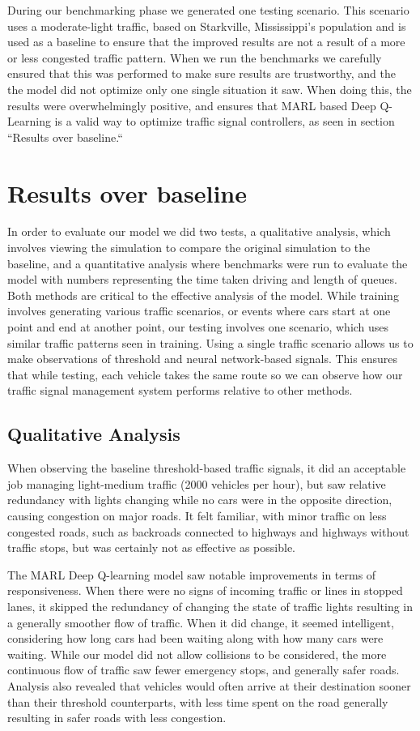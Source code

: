 \documentclass[conference]{IEEEtran}
\begin{document}
During our benchmarking phase we generated one testing scenario. This scenario uses a moderate-light traffic, based on Starkville, Mississippi's population and is used as a baseline to ensure that the improved results are not a result of a more or less congested traffic pattern. When we run the benchmarks we carefully ensured that this was performed to make sure results are trustworthy, and the the model did not optimize only one single situation it saw. When doing this, the results were overwhelmingly positive, and ensures that MARL based Deep Q-Learning is a valid way to optimize traffic signal controllers, as seen in section ``Results over baseline.``

\section{Results over baseline}

In order to evaluate our model we did two tests, a qualitative analysis, which involves viewing the simulation to compare the original simulation to the baseline, and a quantitative analysis where benchmarks were run to evaluate the model with numbers representing the time taken driving and length of queues. Both methods are critical to the effective analysis of the model. While training involves generating various traffic scenarios, or events where cars start at one point and end at another point, our testing involves one scenario, which uses similar traffic patterns seen in training. Using a single traffic scenario allows us to make observations of threshold and neural network-based signals. This ensures that while testing, each vehicle takes the same route so we can observe how our traffic signal management system performs relative to other methods. 

\subsection{Qualitative Analysis}

When observing the baseline threshold-based traffic signals, it did an acceptable job managing light-medium traffic (2000 vehicles per hour), but saw relative redundancy with lights changing while no cars were in the opposite direction, causing congestion on major roads. It felt familiar, with minor traffic on less congested roads, such as backroads connected to highways and highways without traffic stops, but was certainly not as effective as possible. 

The MARL Deep Q-learning model saw notable improvements in terms of responsiveness. When there were no signs of incoming traffic or lines in stopped lanes, it skipped the redundancy of changing the state of traffic lights resulting in a generally smoother flow of traffic. When it did change, it seemed intelligent, considering how long cars had been waiting along with how many cars were waiting. While our model did not allow collisions to be considered, the more continuous flow of traffic saw fewer emergency stops, and generally safer roads. Analysis also revealed that vehicles would often arrive at their destination sooner than their threshold counterparts, with less time spent on the road generally resulting in safer roads with less congestion.  
\end{document}
